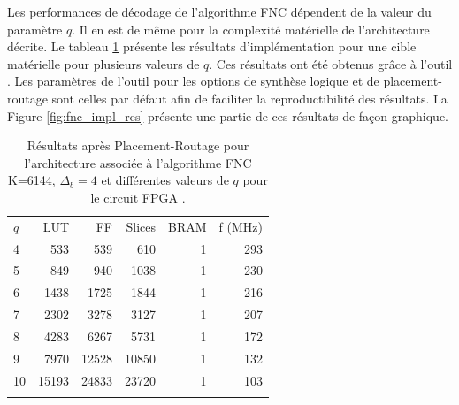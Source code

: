 Les performances de décodage de l'algorithme FNC dépendent de la valeur du paramètre $q$. Il en est de même pour la
complexité matérielle de l'architecture décrite. Le tableau \ref{tab:fnc_impl_res_4} présente les résultats 
d'implémentation pour une cible matérielle   pour plusieurs valeurs de $q$. Ces
résultats ont été obtenus grâce à l'outil . Les paramètres de l'outil pour les options de synthèse logique
et de placement-routage sont celles par défaut afin de faciliter la reproductibilité des résultats. La Figure \ref{fig:fnc_impl_res} présente une partie de ces résultats de façon graphique.

\begin{table}[!tb]
	\centering
	\caption{Résultats après Placement-Routage pour l'architecture associée à l'algorithme FNC K=6144, 
	$\Delta_b = 4$ et différentes valeurs de $q$ pour le circuit FPGA  . }
	\label{tab:fnc_impl_res_4}
	\begin{tabular}{lrrrrr} 
		\toprule
		$q$ & LUT   & FF    & Slices & BRAM & f (MHz) \\ 	\cmidrule(r){1-1}\cmidrule(l){2-6}
		4   &  533  &  539  & 610    & 1	& 293     \\
		5   &  849  &  940  & 1038   & 1	& 230     \\
		6   & 1438  & 1725  & 1844   & 1    & 216     \\
		7   & 2302  & 3278  & 3127   & 1	& 207     \\
		8   & 4283  & 6267  & 5731   & 1    & 172     \\
		9   & 7970	& 12528 & 10850  & 1    & 132     \\
		10  & 15193 & 24833 & 23720  & 1    & 103     \\
		\bottomrule \vspace*{1em}
	\end{tabular}
\end{table}

